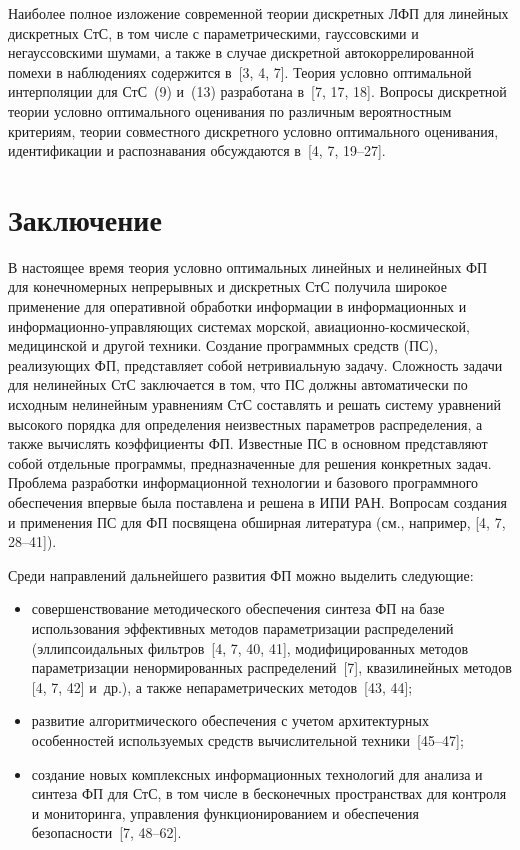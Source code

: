 \begin{multicols}{2}
Наиболее полное изложение современной теории дискретных ЛФП
для линейных дискретных СтС, в том числе с
па\-ра\-мет\-ри\-че\-ски\-ми, гауссовскими и негауссовскими шумами, а также в
случае дискретной автокоррелированной помехи в наблюдениях
содержится в~[3, 4, 7]. Теория условно оптимальной интерполяции
для СтС~(9) и~(13) разработана в~[7, 17, 18]. Вопросы дискретной
теории условно оптимального оценивания по различным вероятностным
критериям, теории совместного дискретного условно оптимального
оценивания, идентификации и распознавания обсуждаются в~[4, 7, 19--27].

\section{Заключение}

В настоящее время теория условно оптимальных линейных и нелинейных ФП для 
конечномерных непрерывных и дискретных СтС получила широкое применение для 
оперативной обработки инфор\-ма\-ции в информационных и 
ин\-фор\-ма\-ци\-он\-но-управ\-ля\-ющих системах морской, 
авиа\-ци\-он\-но-кос\-ми\-че\-ской, медицинской и другой техники. Создание 
программных средств (ПС), реализующих ФП, представляет собой нетривиальную 
задачу. Сложность задачи для нелинейных СтС заключается в том, что ПС должны 
автоматически по исходным нелинейным уравнениям СтС составлять и решать систему 
уравнений высокого порядка для определения неизвестных параметров 
распределения, а также вычислять коэффициенты ФП. Известные ПС в основном 
представляют собой отдельные программы, предназначенные для решения конкретных 
задач. Проблема разработки информационной технологии  и базового 
про\-грам\-мно\-го обеспечения впервые была поставлена и решена в ИПИ РАН. 
Вопросам создания и применения ПС для ФП посвящена обширная литература (см., 
например, [4, 7, 28--41]).

Среди направлений дальнейшего развития ФП можно выделить
следующие:
\begin{itemize}
\item совершенствование методического обеспечения синтеза ФП на базе
использования эффективных методов параметризации распределений
(эллипсоидальных фильтров~[4, 7, 40, 41], модифицированных методов
параметризации ненормированных распределений~[7], квазилинейных
методов [4, 7, 42] и~др.), а также непараметрических методов~[43, 44];
\item развитие алгоритмического обеспечения с учетом архитектурных
особенностей ис\-поль\-зу\-емых средств вычислительной техники~[45--47];
\item
создание новых комплексных информационных технологий для
анализа и синтеза ФП для СтС, в том числе в бесконечных
пространствах для контроля и мониторинга, управления
функционированием и обеспечения безопасности~[7, 48--62].
\end{itemize}


\end{multicols}
